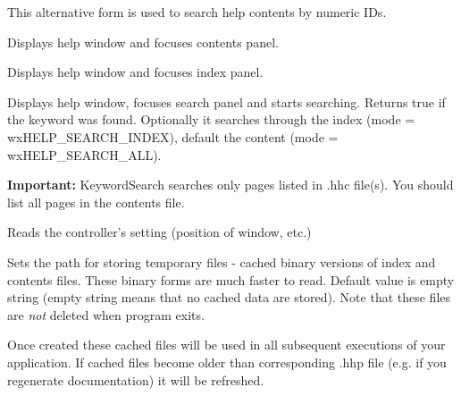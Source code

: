 
This alternative form is used to search help contents by numeric IDs.


\label{wxhtmlhelpcontrollerdisplaycontents}


Displays help window and focuses contents panel.

\label{wxhtmlhelpcontrollerdisplayindex}


Displays help window and focuses index panel.

\label{wxhtmlhelpcontrollerkeywordsearch}


Displays help window, focuses search panel and starts searching.  Returns true
if the keyword was found. Optionally it searches through the index (mode =
wxHELP\_SEARCH\_INDEX), default the content (mode = wxHELP\_SEARCH\_ALL).

{\bf Important:} KeywordSearch searches only pages listed in .hhc file(s).
You should list all pages in the contents file.

\label{wxhtmlhelpcontrollerreadcustomization}


Reads the controller's setting (position of window, etc.)

\label{wxhtmlhelpcontrollersettempdir}


Sets the path for storing temporary files - cached binary versions of index and contents files. These binary
forms are much faster to read. Default value is empty string (empty string means
that no cached data are stored). Note that these files are {\it not} 
deleted when program exits.

Once created these cached files will be used in all subsequent executions 
of your application. If cached files become older than corresponding .hhp
file (e.g. if you regenerate documentation) it will be refreshed.

